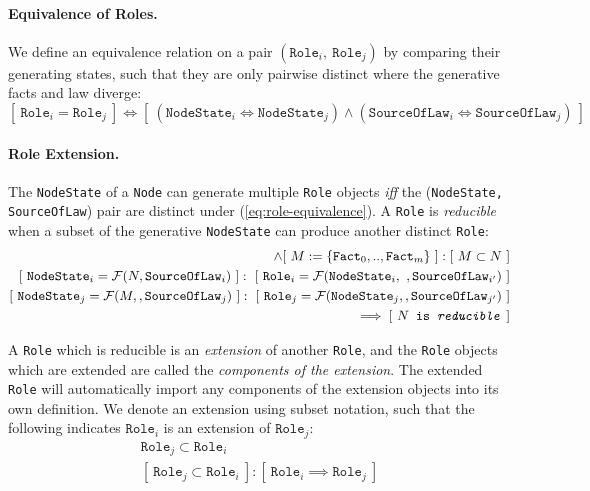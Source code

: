 \documentclass{article}
\numberwithin{equation}{section}
\begin{document}
\paragraph{Equivalence of Roles.} We define an equivalence relation on a pair $(\texttt{Role}_i, \ \texttt{Role}_j)$ by comparing their generating states, such that they are only pairwise distinct where the generative facts and law diverge:  
\begin{equation}\label{eq:role-equivalence}
[ \ \texttt{Role}_i = \texttt{Role}_j \ ] \iff [ \ (\texttt{NodeState}_i \iff \texttt{NodeState}_j) \land (\texttt{SourceOfLaw}_i \iff \texttt{SourceOfLaw}_j) \ ]
\end{equation}

\paragraph{Role Extension.} The \texttt{NodeState} of a \texttt{Node} can generate multiple \texttt{Role} objects \textit{iff} the (\texttt{NodeState, SourceOfLaw}) pair are distinct under (\ref{eq:role-equivalence}). A \texttt{Role} is \textit{reducible} when a subset of the generative \texttt{NodeState} can produce another distinct \texttt{Role}:
\begin{align}
	[ \ N := \{ \texttt{Fact}_0, .., \texttt{Fact}_n \} \ ] \land [ \ M := \{ \texttt{Fact}_0, .., \texttt{Fact}_m \} \ ] : [ \ M \subset N \ ] \\
	[ \ \texttt{NodeState}_i = \mathcal{F}(N, \texttt{SourceOfLaw}_i) \ ] : \ [ \ \texttt{Role}_i = \mathcal{F}(\texttt{NodeState}_i, \ , \texttt{SourceOfLaw}_{i'}) \ ] \\
	[ \ \texttt{NodeState}_j = \mathcal{F}(M, , \texttt{SourceOfLaw}_j) \ ] : \ [ \ \texttt{Role}_j = \mathcal{F}(\texttt{NodeState}_j, , \texttt{SourceOfLaw}_{j'}) \ ] \\
	\qquad \implies [ \ \texttt{$N$ is \textit{reducible}} \ ]
\end{align}

A \texttt{Role} which is reducible is an \textit{extension} of another \texttt{Role}, and the \texttt{Role} objects which are extended are called the \textit{components of the extension}. The extended \texttt{Role} will automatically import any components of the extension objects into its own definition. We denote an extension using subset notation, such that the following indicates $\texttt{Role}_i$ is an extension of $\texttt{Role}_j$: 
\begin{align}
	\texttt{Role}_j \subset \texttt{Role}_i \\
	[ \ \texttt{Role}_j \subset \texttt{Role}_i \ ] : [ \ \texttt{Role}_i \implies \texttt{Role}_j \ ]
\end{align}
\end{document}
